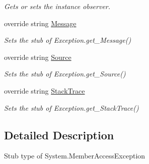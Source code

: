 \begin{DoxyCompactItemize}
\begin{DoxyCompactList}\small\item\em Gets or sets the instance observer.\end{DoxyCompactList}\item 
override string \hyperlink{class_system_1_1_fakes_1_1_stub_member_access_exception_a10a91a485391c1cc3489302256a5ee6b}{Message}
\begin{DoxyCompactList}\small\item\em Sets the stub of Exception.\-get\-\_\-\-Message()\end{DoxyCompactList}\item 
override string \hyperlink{class_system_1_1_fakes_1_1_stub_member_access_exception_abbeae94f648dd81825c04bc9637a68b6}{Source}
\begin{DoxyCompactList}\small\item\em Sets the stub of Exception.\-get\-\_\-\-Source()\end{DoxyCompactList}\item 
override string \hyperlink{class_system_1_1_fakes_1_1_stub_member_access_exception_a48817936c39f9865c084f9c037833eb8}{Stack\-Trace}
\begin{DoxyCompactList}\small\item\em Sets the stub of Exception.\-get\-\_\-\-Stack\-Trace()\end{DoxyCompactList}\end{DoxyCompactItemize}


\subsection{Detailed Description}
Stub type of System.\-Member\-Access\-Exception



